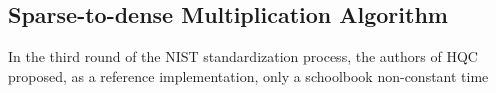 \subsection{Sparse-to-dense Multiplication Algorithm}\label{subsec:shift_add}
In the third round of the NIST standardization process, the authors of HQC 
proposed, as a reference implementation, only a schoolbook non-constant time 
